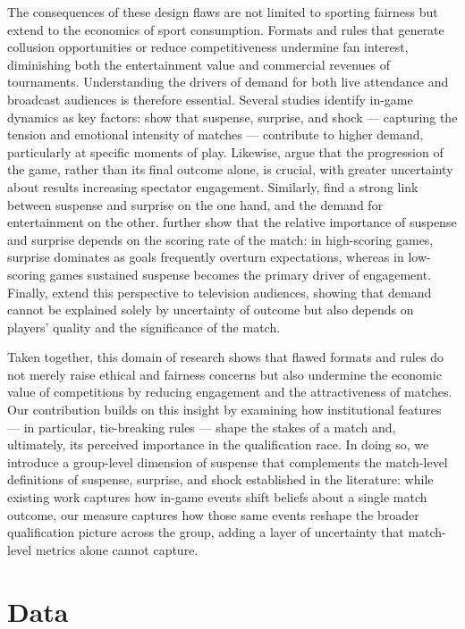 \documentclass[11pt]{article}
\begin{document}
The consequences of these design flaws are not limited to sporting fairness but extend to the economics of sport consumption. Formats and rules that generate collusion opportunities or reduce competitiveness undermine fan interest, diminishing both the entertainment value and commercial revenues of tournaments. Understanding the drivers of demand for both live attendance and broadcast audiences is therefore essential. Several studies identify in-game dynamics as key factors: \citet{buraimo2020unscripted} show that suspense, surprise, and shock — capturing the tension and emotional intensity of matches — contribute to higher demand, particularly at specific moments of play. Likewise, \citet{alavy2010edge} argue that the progression of the game, rather than its final outcome alone, is crucial, with greater uncertainty about results increasing spectator engagement. Similarly, \citet{bizzozero2016importance} find a strong link between suspense and surprise on the one hand, and the demand for entertainment on the other. \citet{flepp2026suspense} further show that the relative importance of suspense and surprise depends on the scoring rate of the match: in high-scoring games, surprise dominates as goals frequently overturn expectations, whereas in low-scoring games sustained suspense becomes the primary driver of engagement. Finally, \citet{buraimo2022armchair} extend this perspective to television audiences, showing that demand cannot be explained solely by uncertainty of outcome but also depends on players' quality and the significance of the match.

Taken together, this domain of research shows that flawed formats and rules do not merely raise ethical and fairness concerns but also undermine the economic value of competitions by reducing engagement and the attractiveness of matches. Our contribution builds on this insight by examining how institutional features — in particular, tie-breaking rules — shape the stakes of a match and, ultimately, its perceived importance in the qualification race. In doing so, we introduce a group-level dimension of suspense that complements the match-level definitions of suspense, surprise, and shock established in the literature: while existing work captures how in-game events shift beliefs about a single match outcome, our measure captures how those same events reshape the broader qualification picture across the group, adding a layer of uncertainty that match-level metrics alone cannot capture.



\section{Data}
\label{sec:data}
\end{document}
